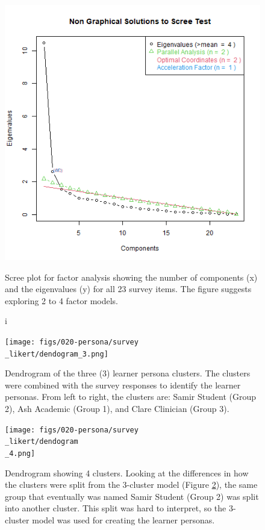 \documentclass[020-persona\_validation.tex]{subfiles}
\begin{document}
    \begin{figure}[!hbtp]
        \centering
        \includegraphics[scale=0.5]{figs/010-validation/efa_eigen_scree.png}
        \caption[Scree plot for factor analysis]i
        {Scree plot for factor analysis showing the number of components (x) and the eigenvalues (y) for all 23 survey items.
            The figure suggests exploring 2 to 4 factor models.
        }
        \label{fig:scree-fa-all}
    \end{figure}

    \begin{figure}[!hbtp]
        \centering
        \texttt{[image: figs/020-persona/survey\\\_likert/dendogram\_3.png]}
        \caption[Dendrogram of the 3 learner persona clusters]
        {Dendrogram of the three (3) learner persona clusters.
        The clusters were combined with the survey responses to identify the learner personas.
        From left to right, the clusters are: Samir Student (Group 2), Ash Academic (Group 1),
        and Clare Clinician (Group 3).
        }
        \label{fig:dendro-cluster-3}
    \end{figure}

    \begin{figure}[!hbtp]
        \centering
        \texttt{[image: figs/020-persona/survey\\\_likert/dendogram\\\_4.png]}
        \caption[4 cluster Dendrogram.]
        {Dendrogram showing 4 clusters. Looking at the differences in how the clusters were split from the 3-cluster model
        (Figure \ref{fig:dendro-cluster-3}),
        the same group that eventually was named Samir Student (Group 2) was split into another cluster.
        This split was hard to interpret, so the 3-cluster model was used for creating the learner personas.
        }
        \label{fig:dendro-4}
    \end{figure}
\end{document}
